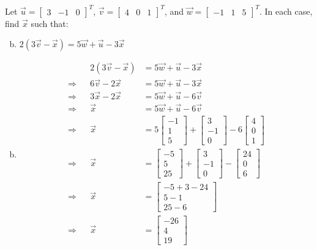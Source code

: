 \documentclass[../main.tex]{subfiles}
\begin{document}
Let
$\vec{u} = \begin{bmatrix}3&-1&0\end{bmatrix}^T$,
$\vec{v} = \begin{bmatrix}4&0&1\end{bmatrix}^T$, and
$\vec{w} = \begin{bmatrix}-1&1&5\end{bmatrix}^T$.
In each case, find $\vec{x}$ such that:
\begin{enumerate}[a)]
	\setcounter{enumi}{1}
	\item $2(3\vec{v} - \vec{x}) = 5\vec{w} + \vec{u} - 3\vec{x}$
\end{enumerate}

\solution
\begin{enumerate}[a)]
	\setcounter{enumi}{1}
	\item 
		\begin{align*}
			&& 2(3\vec{v} - \vec{x}) &= 5\vec{w} + \vec{u} - 3\vec{x} \\
			\Rightarrow && 6\vec{v} - 2\vec{x} &= 5\vec{w} + \vec{u} - 3\vec{x} \\
			\Rightarrow && 3\vec{x} - 2\vec{x} &= 5\vec{w} + \vec{u} - 6\vec{v} \\
			\Rightarrow && \vec{x} &= 5\vec{w} + \vec{u} - 6\vec{v} \\
			\Rightarrow && \vec{x} &= 5\begin{bmatrix}-1\\1\\5\end{bmatrix} + \begin{bmatrix}3\\-1\\0\end{bmatrix} - 6\begin{bmatrix}4\\0\\1\end{bmatrix} \\
			\Rightarrow && \vec{x} &= \begin{bmatrix}-5\\5\\25\end{bmatrix} + \begin{bmatrix}3\\-1\\0\end{bmatrix} - \begin{bmatrix}24\\0\\6\end{bmatrix} \\
			\Rightarrow && \vec{x} &= \begin{bmatrix}-5 + 3 - 24\\5 - 1\\25 - 6\end{bmatrix} \\
			\Rightarrow && \vec{x} &= \begin{bmatrix}-26\\4\\19\end{bmatrix} \\
		\end{align*}
\end{enumerate}
\end{document}
